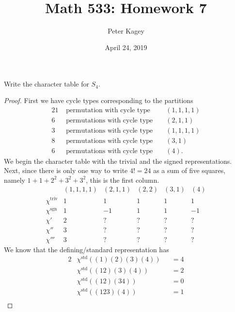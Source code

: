 \documentclass{article}
\newenvironment{problem}[2][Problem]{\begin{trivlist}
\item[\hskip \labelsep {\bfseries #1}\hskip \labelsep {\bfseries #2.}]}{\end{trivlist}}
\begin{document}
\title{Math 533: Homework 7}
\author{Peter Kagey}
\date{April 24, 2019}

\maketitle

\begin{problem}{1}
  Write the character table for $S_4$.
\end{problem}

\begin{proof}
  First we have cycle types corresponding to the partitions \begin{alignat*}{2}
    1 &\text{ permutation with cycle type }  && (1, 1, 1, 1) \\
    6 &\text{ permutations with cycle type } && (2, 1, 1) \\
    3 &\text{ permutations with cycle type } && (1, 1, 1, 1) \\
    8 &\text{ permutations with cycle type } && (3, 1) \\
    6 &\text{ permutations with cycle type } && (4).
  \end{alignat*}
  We begin the character table with the trivial and the signed representations.
  Next, since there is only one way to write $4! = 24$ as a sum of five squares,
  namely $1 + 1 + 2^2 + 3^2 + 3^2$, this is the first column.
  \[
  \begin{array}{ l|rrrrr }
                    & (1,1,1,1) & (2,1,1) & (2,2) & (3,1) & (4) \\
   \hline
   \chi^\text{triv} & 1 &  1 & 1 &  1 &  1 \\
   \chi^\text{sgn}  & 1 & -1 & 1 &  1 & -1 \\
   \chi'            & 2 & ? &  ? &  ? &  ? \\
   \chi''           & 3 & ? &  ? &  ? &  ? \\
   \chi'''          & 3 & ? &  ? &  ? &  ?
 \end{array}
  \]
  We know that the defining/standard representation has \begin{alignat*}{2}
      &\chi^\text{std}((1)(2)(3)(4)) &&= 4 \\
      &\chi^\text{std}((12)(3)(4)) &&= 2 \\
      &\chi^\text{std}((12)(34)) &&= 0 \\
      &\chi^\text{std}((123)(4)) &&= 1 \\

\end{alignat*}
\end{proof}
\end{document}
